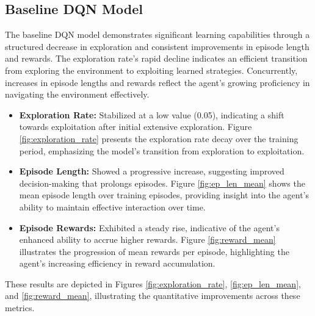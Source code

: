 \documentclass{article}
\begin{document}
\subsection{Baseline DQN Model}

The baseline DQN model demonstrates significant learning capabilities through a structured decrease in exploration and consistent improvements in episode length and rewards. The exploration rate's rapid decline indicates an efficient transition from exploring the environment to exploiting learned strategies. Concurrently, increases in episode lengths and rewards reflect the agent's growing proficiency in navigating the environment effectively.

\begin{itemize}
    \item \textbf{Exploration Rate:} Stabilized at a low value (0.05), indicating a shift towards exploitation after initial extensive exploration. Figure \ref{fig:exploration_rate} presents the exploration rate decay over the training period, emphasizing the model's transition from exploration to exploitation.
    \item \textbf{Episode Length:} Showed a progressive increase, suggesting improved decision-making that prolongs episodes. Figure \ref{fig:ep_len_mean} shows the mean episode length over training episodes, providing insight into the agent's ability to maintain effective interaction over time.
    \item \textbf{Episode Rewards:} Exhibited a steady rise, indicative of the agent's enhanced ability to accrue higher rewards. Figure \ref{fig:reward_mean} illustrates the progression of mean rewards per episode, highlighting the agent's increasing efficiency in reward accumulation.
\end{itemize}

These results are depicted in Figures \ref{fig:exploration_rate}, \ref{fig:ep_len_mean}, and \ref{fig:reward_mean}, illustrating the quantitative improvements across these metrics.
\end{document}

